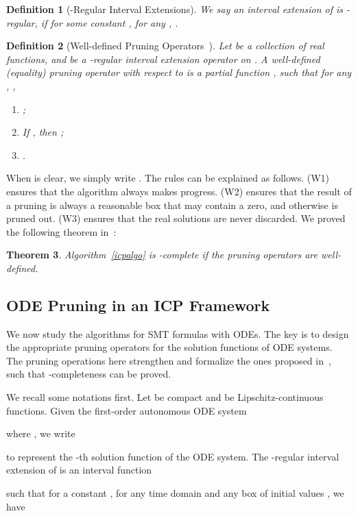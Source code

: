 \documentclass[12pt]{article}
\newtheorem{theorem}{Theorem}[section]
\newtheorem{definition}[theorem]{Definition}
\begin{document}
\begin{definition}[-Regular Interval Extensions]
We say an interval extension  of  is -regular, if for some constant , for any , . 
\end{definition}
\begin{definition}[Well-defined Pruning Operators~\cite{DBLP:conf/cade/GaoAC12}]\label{well}
Let  be a collection of real functions, and  be a -regular interval extension operator on . A {\em well-defined (equality) pruning operator} with respect to  is a partial function , such that for any , ,
\begin{enumerate}
\item ;
\item If , then ;
\item .
\end{enumerate}
\end{definition}
When  is clear, we simply write . The rules can be explained as follows. (W1) ensures that the algorithm always makes progress. (W2) ensures that the result of a pruning is always a reasonable box that may contain a zero, and otherwise  is pruned out. (W3) ensures that the real solutions are never discarded. We proved the following theorem in~\cite{DBLP:conf/cade/GaoAC12}:
\begin{theorem}
Algorithm~\ref{icpalgo} is -complete if the pruning operators are well-defined. 
\end{theorem}


\subsection{ODE Pruning in an ICP Framework}

We now study the algorithms for SMT formulas with ODEs. The key is to design the appropriate pruning operators for the solution functions of ODE systems. The pruning operations here strengthen and formalize the ones proposed in~\cite{Eggers2008,Eggers2011,DBLP:conf/cp/GoldsztejnMEH10}, such that -completeness can be proved. 

We recall some notations first. Let  be compact and  be  Lipschitz-continuous functions. Given the first-order autonomous ODE system

where , we write

to represent the -th solution function of the ODE system. The -regular interval extension of  is an interval function

such that for a constant , for any time domain  and any box of initial values , we have
\end{document}
